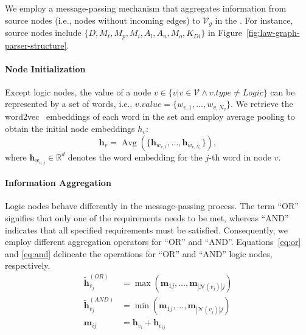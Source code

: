 We employ a message-passing mechanism that aggregates information from source nodes (i.e., nodes without incoming edges) to $\mathcal{V}_g$ in the \lawgraph{}. For instance, source nodes include $\{D, M_t, M_p, M_i, A_l, A_n, M_o, K_{Di}\}$ in Figure~\ref{fig:law-graph-parser-structure}. %

\paragraph{Node Initialization} Except logic nodes, the value of a node $v\in \{v|v\in \mathcal{V} \land v.type\neq Logic\}$ can be represented by a set of words, i.e., $v.value=\{w_{v,1},\ldots,w_{v, N_{v}}\}$. We retrieve the word2vec~\cite{10.1145/3375395.3387641} embeddings of each word in the set and employ average pooling to obtain the initial node embeddings $h_{v}$: 
\begin{equation}
    \mathbf{h}_{v} = \operatorname{Avg}(\{\mathbf{h}_{w_{v,1}},\ldots,\mathbf{h}_{w_{v,N_{v}}}\}),
    \label{eq:node}
\end{equation}
where $\mathbf{h}_{w_{v,j}} \in \mathbb{R}^{d}$ denotes the word embedding for the $j$-th word in node $v$.

\paragraph{Information Aggregation} Logic nodes behave differently in the message-passing process. The term ``OR'' signifies that only one of the requirements needs to be met, whereas ``AND'' indicates that all specified requirements must be satisfied. Consequently, we employ different aggregation operators for ``OR'' and ``AND''.
Equations~\ref{eq:or} and \ref{eq:and} delineate the operations for ``OR'' and ``AND'' logic nodes, respectively.
\begin{align}
\tilde{\mathbf{h}}_{v_j}^{(OR)} &= \max(\mathbf{m}_{1j},\ldots,\mathbf{m}_{|\mathcal{N}(v_j)|j}) \label{eq:or} \\
\tilde{\mathbf{h}}_{v_j}^{(AND)} &= \min(\mathbf{m}_{1j},\ldots,\mathbf{m}_{|\mathcal{N}(v_j)|j}) \label{eq:and} \\
\mathbf{m}_{ij} &= \mathbf{h}_{v_i} + \mathbf{h}_{e_{ij}}
\end{align}

